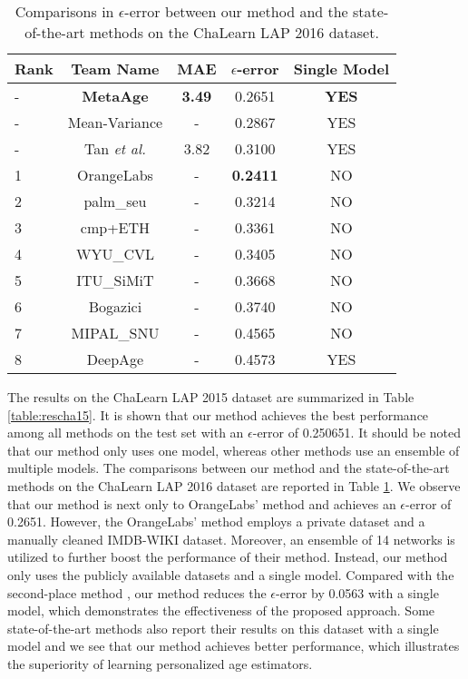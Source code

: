 \documentclass[journal,twoside]{IEEEtran}
\begin{document}
\begin{table}[t]
\caption{Comparisons in $\epsilon$-error between our method and  the state-of-the-art methods on the ChaLearn LAP 2016 dataset.}
\label{table:rescha16}
\centering
\begin{tabular}{lcccc}
\toprule
Rank  & Team Name  & MAE & $\epsilon$-error & Single Model \\
\midrule
- & \textbf{MetaAge} & \textbf{3.49} & 0.2651 & \textbf{YES} \\
- &  Mean-Variance \cite{pan2018mean}& - & 0.2867 & YES \\
- &  Tan \emph{et al.} \cite{tan2017efficient} &  3.82 & 0.3100 & YES \\
\midrule
1 & OrangeLabs \cite{antipov2016apparent} & - & \textbf{0.2411} & NO \\
2 & palm\_seu \cite{huo2016deep} & - & 0.3214 & NO \\
3 & cmp+ETH & - & 0.3361 & NO \\
4 & WYU\_CVL & - & 0.3405 & NO \\
5 & ITU\_SiMiT \cite{can2016apparent} & - &  0.3668 & NO \\
6 & Bogazici \cite{gurpinar2016kernel} & - & 0.3740 & NO  \\
7 & MIPAL\_SNU & - & 0.4565 & NO \\
8 & DeepAge & - & 0.4573 & YES  \\
\bottomrule
\end{tabular}
\end{table}




The results on the ChaLearn LAP 2015 dataset are summarized in Table \ref{table:rescha15}. It is shown that our method achieves the best performance among all methods on the test set with an $\epsilon$-error of 0.250651. It should be noted that our method only uses one model, whereas other methods use an ensemble of multiple models. The comparisons between our method and the state-of-the-art methods on the ChaLearn LAP 2016 dataset are reported in Table \ref{table:rescha16}. We observe that our method is next only to OrangeLabs' method \cite{antipov2016apparent} and achieves an $\epsilon$-error of 0.2651. However, the OrangeLabs' method employs a private dataset and a manually cleaned IMDB-WIKI dataset. Moreover, an ensemble of 14 networks is utilized to further boost the performance of their method. Instead, our method only uses the publicly available datasets and a single model. Compared with the second-place method \cite{huo2016deep}, our method reduces the $\epsilon$-error by 0.0563 with a single model, which demonstrates the effectiveness of the proposed approach. Some state-of-the-art methods also report their results on this dataset with a single model and we see that our method achieves better performance, which illustrates the superiority of learning personalized age estimators.
\end{document}
